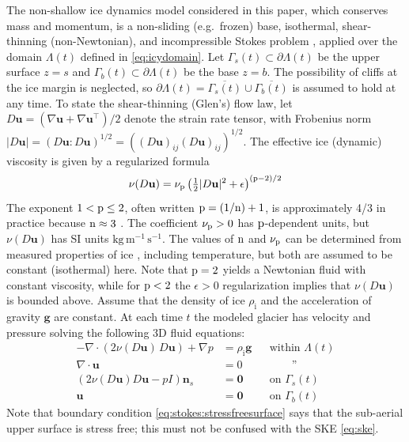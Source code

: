 \documentclass[hidelinks,onefignum,onetabnum,final]{siamart220329}  %
\newcommand{\eps}{\epsilon}
\newcommand{\grad}{\nabla}
\newcommand{\bg}{\mathbf{g}}
\newcommand{\bn}{\mathbf{n}}
\newcommand{\bu}{\mathbf{u}}
\newcommand{\bzero}{\bm{0}}
\newcommand{\nn}{{\text{\textnormal{n}}}}
\newcommand{\pp}{{\text{\textnormal{p}}}}
\newcommand{\rhoi}{\rho_{\text{i}}}
\begin{document}
The non-shallow ice dynamics model considered in this paper, which conserves mass and momentum, is a non-sliding (e.g.~frozen) base, isothermal, shear-thinning (non-Newtonian), and incompressible Stokes problem \cite{GreveBlatter2009,JouvetRappaz2011,SchoofHewitt2013}, applied over the domain $\Lambda(t)$ defined in \eqref{eq:icydomain}.  Let $\Gamma_s(t) \subset \partial \Lambda(t)$ be the upper surface $z=s$ and $\Gamma_b(t) \subset \partial \Lambda(t)$ be the base $z=b$.  The possibility of cliffs at the ice margin is neglected, so $\partial \Lambda(t) = \overline{\Gamma_s(t)} \cup \overline{\Gamma_b(t)}$ is assumed to hold at any time.  To state the shear-thinning (Glen's) flow law, let $D\bu=(\grad \bu + \grad \bu^{\top})/2$ denote the strain rate tensor, with Frobenius norm $|D\bu| = (D\bu:D\bu)^{1/2} = \left((D\bu)_{ij} (D\bu)_{ij}\right)^{1/2}$.  The effective ice (dynamic) viscosity \cite{GreveBlatter2009} is given by a regularized formula
\begin{equation}
\nu(D\bu) = \nu_\pp \left(\tfrac{1}{2} |D\bu|^2 + \eps\right)^{(\pp-2)/2} \label{eq:glen}
\end{equation}
The exponent $1 < \pp \le 2$, often written $\pp=(1/\nn)+1$, is approximately 4/3 in practice because $\nn\approx 3$ \cite{GreveBlatter2009}.  The coefficient $\nu_\pp>0$ has $\pp$-dependent units, but $\nu(D\bu)$ has SI units $\text{kg}\,\text{m}^{-1}\,\text{s}^{-1}$.  The values of $\nn$ and $\nu_\pp$ can be determined from measured properties of ice \cite{GoldsbyKohlstedt2001,GreveBlatter2009}, including temperature, but both are assumed to be constant (isothermal) here.  Note that $\pp=2$ yields a Newtonian fluid with constant viscosity, while for $\pp < 2$ the $\eps>0$ regularization implies that $\nu(D\bu)$ is bounded above.  Assume that the density of ice $\rhoi$ and the acceleration of gravity $\bg$ are constant.  At each time $t$ the modeled glacier has velocity and pressure solving the following 3D fluid equations:
\begin{subequations}
\label{eq:stokes}
\begin{align}
- \nabla \cdot \left(2 \nu(D\bu)\, D\bu\right) + \nabla p &= \rhoi \bg && \text{within $\Lambda(t)$} \\
\nabla \cdot \bu &= 0 && \qquad \text{''} \label{eq:stokes:incomp} \\
\left(2 \nu(D\bu) D\bu - pI\right) \bn_s &= \bzero && \text{on $\Gamma_s(t)$}\label{eq:stokes:stressfreesurface} \\
\bu  &= \bzero && \text{on $\Gamma_b(t)$} \label{eq:stokes:noslide}
\end{align}
\end{subequations}
Note that boundary condition \eqref{eq:stokes:stressfreesurface} says that the sub-aerial upper surface is stress free; this must not be confused with the SKE \eqref{eq:ske}.
\end{document}
